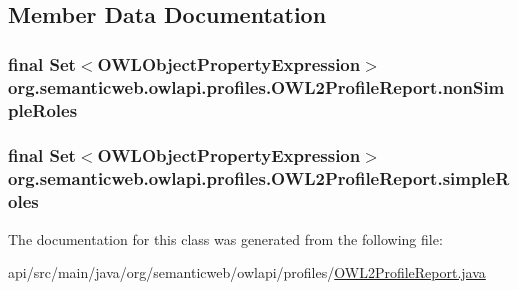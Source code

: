 \subsection{Member Data Documentation}
\hypertarget{classorg_1_1semanticweb_1_1owlapi_1_1profiles_1_1_o_w_l2_profile_report_ab2b4842785549a5695bda2356084d55d}{
\subsubsection[{non\-Simple\-Roles}]{\setlength{\rightskip}{0pt plus 5cm}final Set$<${\bf O\-W\-L\-Object\-Property\-Expression}$>$ org.\-semanticweb.\-owlapi.\-profiles.\-O\-W\-L2\-Profile\-Report.\-non\-Simple\-Roles\hspace{0.3cm}{\ttfamily [private]}}}\label{classorg_1_1semanticweb_1_1owlapi_1_1profiles_1_1_o_w_l2_profile_report_ab2b4842785549a5695bda2356084d55d}
\hypertarget{classorg_1_1semanticweb_1_1owlapi_1_1profiles_1_1_o_w_l2_profile_report_a74fba7c1e8d24b9d655a833ba2c64d16}{
\subsubsection[{simple\-Roles}]{\setlength{\rightskip}{0pt plus 5cm}final Set$<${\bf O\-W\-L\-Object\-Property\-Expression}$>$ org.\-semanticweb.\-owlapi.\-profiles.\-O\-W\-L2\-Profile\-Report.\-simple\-Roles\hspace{0.3cm}{\ttfamily [private]}}}\label{classorg_1_1semanticweb_1_1owlapi_1_1profiles_1_1_o_w_l2_profile_report_a74fba7c1e8d24b9d655a833ba2c64d16}


The documentation for this class was generated from the following file\-:\begin{DoxyCompactItemize}
\item 
api/src/main/java/org/semanticweb/owlapi/profiles/\hyperlink{_o_w_l2_profile_report_8java}{O\-W\-L2\-Profile\-Report.\-java}\end{DoxyCompactItemize}
